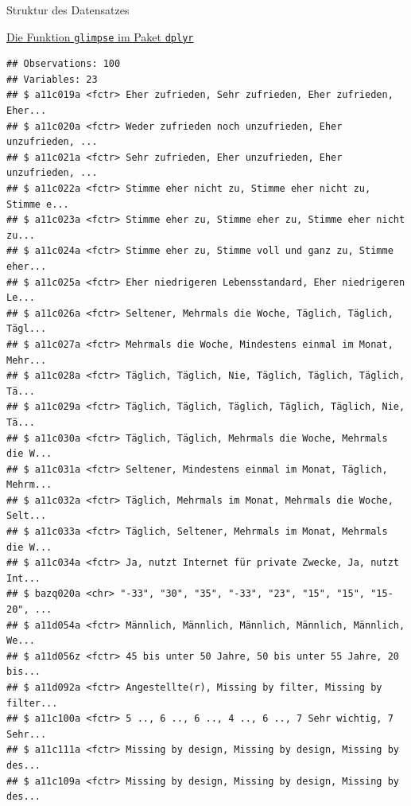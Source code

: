 \documentclass[ignorenonframetext,]{beamer}
\begin{document}
\begin{frame}[fragile]{Struktur des Datensatzes}
\begin{block}{\href{https://stats.stackexchange.com/questions/11551/is-there-a-good-browser-viewer-to-see-an-r-dataset-rda-file}{Die
Funktion \texttt{glimpse} im Paket \texttt{dplyr}}}
\begin{verbatim}
## Observations: 100
## Variables: 23
## $ a11c019a <fctr> Eher zufrieden, Sehr zufrieden, Eher zufrieden, Eher...
## $ a11c020a <fctr> Weder zufrieden noch unzufrieden, Eher unzufrieden, ...
## $ a11c021a <fctr> Sehr zufrieden, Eher unzufrieden, Eher unzufrieden, ...
## $ a11c022a <fctr> Stimme eher nicht zu, Stimme eher nicht zu, Stimme e...
## $ a11c023a <fctr> Stimme eher zu, Stimme eher zu, Stimme eher nicht zu...
## $ a11c024a <fctr> Stimme eher zu, Stimme voll und ganz zu, Stimme eher...
## $ a11c025a <fctr> Eher niedrigeren Lebensstandard, Eher niedrigeren Le...
## $ a11c026a <fctr> Seltener, Mehrmals die Woche, Täglich, Täglich, Tägl...
## $ a11c027a <fctr> Mehrmals die Woche, Mindestens einmal im Monat, Mehr...
## $ a11c028a <fctr> Täglich, Täglich, Nie, Täglich, Täglich, Täglich, Tä...
## $ a11c029a <fctr> Täglich, Täglich, Täglich, Täglich, Täglich, Nie, Tä...
## $ a11c030a <fctr> Täglich, Täglich, Mehrmals die Woche, Mehrmals die W...
## $ a11c031a <fctr> Seltener, Mindestens einmal im Monat, Täglich, Mehrm...
## $ a11c032a <fctr> Täglich, Mehrmals im Monat, Mehrmals die Woche, Selt...
## $ a11c033a <fctr> Täglich, Seltener, Mehrmals im Monat, Mehrmals die W...
## $ a11c034a <fctr> Ja, nutzt Internet für private Zwecke, Ja, nutzt Int...
## $ bazq020a <chr> "-33", "30", "35", "-33", "23", "15", "15", "15-20", ...
## $ a11d054a <fctr> Männlich, Männlich, Männlich, Männlich, Männlich, We...
## $ a11d056z <fctr> 45 bis unter 50 Jahre, 50 bis unter 55 Jahre, 20 bis...
## $ a11d092a <fctr> Angestellte(r), Missing by filter, Missing by filter...
## $ a11c100a <fctr> 5 .., 6 .., 6 .., 4 .., 6 .., 7 Sehr wichtig, 7 Sehr...
## $ a11c111a <fctr> Missing by design, Missing by design, Missing by des...
## $ a11c109a <fctr> Missing by design, Missing by design, Missing by des...
\end{verbatim}

\end{block}

\end{frame}
\end{document}
